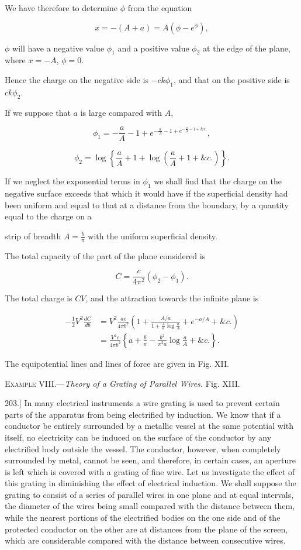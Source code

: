 \documentclass[11pt,a4paper]{article}
\begin{document}
We have therefore to determine $\phi$ from the equation

\[
x=-(A+a)=A(\phi-e^\phi),
\]

$\phi$ will have a negative value $\phi_1$ and a positive value
$\phi_2$ at the edge of the plane, where $x=-A$, $\phi=0$.

Hence the charge on the negative side is $-ck\phi_1$, and that on the
positive side is $ck\phi_2$.

If we suppose that $a$ is large compared with $A$,

\[
\phi_1=-\frac{a}{A}-1+e^{-\frac{a}{A}-1+e^{-\frac{a}{A}-1+\&c.}},
\]

\[
\phi_2=\log\left\{\frac{a}{A}+1+\log\left(\frac{a}{A}+1+\&c.\right)\right\}.
\]

If we neglect the exponential terms in $\phi_1$ we shall find that the
charge on the negative surface exceeds that which it would have if the
superficial density had been uniform and equal to that at a distance
from the boundary, by a quantity equal to the charge on a

strip of breadth $A=\frac{b}{\pi}$ with the uniform superficial density.

The total capacity of the part of the plane considered is

\[
C=\frac{c}{4\pi^2}(\phi_2-\phi_1).
\]

The total charge is $CV$, and the attraction towards the infinite plane
is

\begin{align*}
-\frac{1}{2}V^2\frac{dC}{db}
&=V^2\frac{ac}{4\pi b^2}
\left(1+\frac{A/a}{1+\frac{A}{a}\log\frac{a}{A}}
+e^{-a/A}+\&c.\right)\\
&=\frac{V^2c}{4\pi b^2}\left\{
a+\frac{b}{\pi}-\frac{b^2}{\pi^2a}\log\frac{a}{A}+\&c.
\right\}.
\end{align*}

The equipotential lines and lines of force are given in Fig. XII.

\begin{center}
\textsc{Example VIII.}---\textit{Theory of a Grating of Parallel Wires.} Fig. XIII.
\end{center}

203.] In many electrical instruments a wire grating is used to prevent
certain parts of the apparatus from being electrified by induction. We
know that if a conductor be entirely surrounded by a metallic vessel at
the same potential with itself, no electricity can be induced on the
surface of the conductor by any electrified body outside the vessel. The
conductor, however, when completely surrounded by metal, cannot be seen,
and therefore, in certain cases, an aperture is left which is covered
with a grating of fine wire. Let us investigate the effect of this
grating in diminishing the effect of electrical induction. We shall
suppose the grating to consist of a series of parallel wires in one
plane and at equal intervals, the diameter of the wires being small
compared with the distance between them, while the nearest portions of
the electrified bodies on the one side and of the protected conductor on
the other are at distances from the plane of the screen, which are
considerable compared with the distance between consecutive wires.
\end{document}
